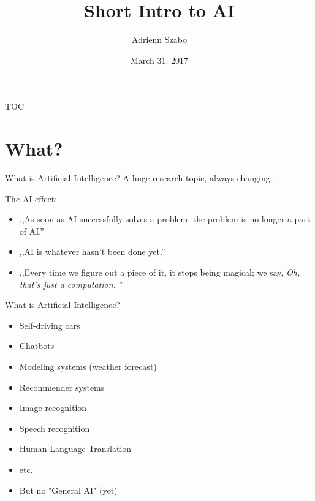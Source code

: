 \documentclass[15pt]{beamer}
\title
{Short Intro to AI}
\author{Adrienn Szabo}
\date
{\scriptsize{March 31. 2017}}
\begin{document}
\begin{frame}
    \titlepage
\end{frame}


\begin{frame}{TOC}
    \normalsize
    \tableofcontents
\end{frame}


\section{What?}


\begin{frame}{What is Artificial Intelligence?}
    A huge research topic, always changing\dots
    \vspace{2mm}

    The \alert{AI effect}:

    \small
    \vspace{2mm}
    \begin{itemize}\itemsep0.8em
        \item ,,As soon as AI successfully solves a problem, the problem is no longer a part of AI.''
        \item ,,AI is whatever hasn't been done yet.''
        \item ,,Every time we figure out a piece of it, it stops being magical; we say, \emph{Oh, that's just a computation.} ''
    \end{itemize}
    \normalsize
\end{frame}


\begin{frame}{What is Artificial Intelligence?}
    \begin{itemize}\itemsep0.6em
        \item Self-driving cars
        \item Chatbots
        \item Modeling systems (weather forecast)
        \item Recommender systems
        \item Image recognition
        \item Speech recognition
        \item Human Language Translation
        \item etc.
        \item \alert{But no "General AI" (yet)}
    \end{itemize}
\end{frame}
\end{document}
